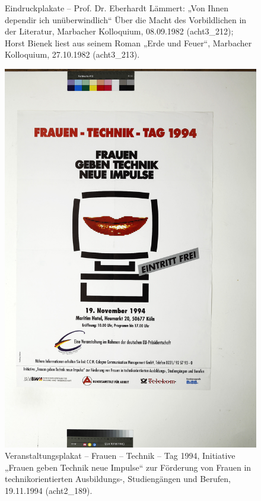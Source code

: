 \documentclass[a4paper,12pt,ngerman]{article}
\begin{document}
\begin{landscape}
\begin{figure}[ht]
\begin{subfigure}[b]{0.5\linewidth}
	\end{subfigure}
	\caption{Eindruckplakate -- Prof. Dr. Eberhardt Lämmert: „Von Ihnen dependir ich unüberwindlich“ Über die Macht des Vorbildlichen in der Literatur, Marbacher Kolloquium, 08.09.1982 (acht3\_212); Horst Bienek liest aus seinem Roman „Erde und Feuer“, Marbacher Kolloquium, 27.10.1982 (acht3\_213).}
\end{figure}
\end{landscape}

\newpage
\begin{figure}[ht]
\includegraphics[width=\linewidth]{Abbildung_5_(acht2_189)}
\centering
\caption{Veranstaltungsplakat -- Frauen -- Technik -- Tag 1994, Initiative „Frauen geben Technik neue Impulse“ zur Förderung von Frauen in technikorientierten Ausbildungs-, Studiengängen und Berufen, 19.11.1994 (acht2\_189).}
\end{figure}
\end{document}
